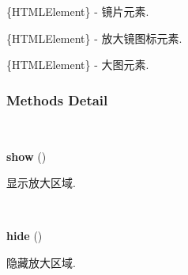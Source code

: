 \documentclass[letterpaper,10pt,english]{sphinxmanual}
\begin{document}

\begin{fulllineitems}
\label{api/component/imagezoom/index:ImageZoom.lens}
\{HTMLElement\} - 镜片元素.

\end{fulllineitems}



\begin{fulllineitems}
\{HTMLElement\} - 放大镜图标元素.

\end{fulllineitems}



\begin{fulllineitems}
\label{api/component/imagezoom/index:ImageZoom.bigImage}
\{HTMLElement\} - 大图元素.

\end{fulllineitems}



\subsubsection{Methods Detail}
\label{api/component/imagezoom/index:methods-detail}

\begin{fulllineitems}
\label{api/component/imagezoom/index:ImageZoom.show}~
\begin{DUlineblock}{0em}
\item[] \textbf{show} ()
\item[] 显示放大区域.
\end{DUlineblock}

\end{fulllineitems}



\begin{fulllineitems}
\label{api/component/imagezoom/index:ImageZoom.hide}~
\begin{DUlineblock}{0em}
\item[] \textbf{hide} ()
\item[] 隐藏放大区域.
\end{DUlineblock}

\end{fulllineitems}
\end{document}
